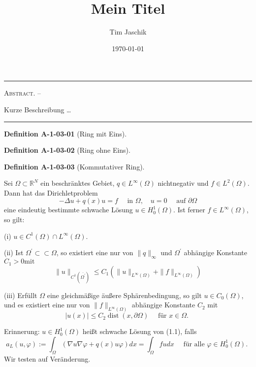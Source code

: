 \documentclass[10pt, letterpaper]{article}
\title{Mein Titel}
\author{Tim Jaschik}
\date{\today}
\renewenvironment{abstract}
  {
    \begin{adjustwidth}{1.5cm}{1.5cm}
    \small
    \textsc{Abstract. –}%
  }
  {
    \end{adjustwidth}
  }
\newcommand{\CustomHeading}[3]{%
  \par\medskip\noindent%
  \textbf{#1 #2} \textnormal{(#3)}.\enskip%
}
\newenvironment{DEF}[2]{\CustomHeading{Definition}{#1}{#2}}{}
\begin{document}
\maketitle
\rule{\textwidth}{0.5pt}
\begin{abstract}
Kurze Beschreibung …
\end{abstract}
\rule{\textwidth}{0.5pt}
\vspace{0.5cm}

\tableofcontents

\pagebreak




\begin{DEF}{A-1-03-01}{Ring mit Eins}
\end{DEF}

\begin{DEF}{A-1-03-02}{Ring ohne Eins}
\end{DEF}

\begin{DEF}{A-1-03-03}{Kommutativer Ring}
Sei $\Omega \subset \mathbb{R}^{N}$ ein beschränktes Gebiet, $q \in L^{\infty}(\Omega)$ nichtnegativ und $f \in L^{2}(\Omega)$. Dann hat das Dirichletproblem
$$
-\Delta u+q(x) u=f \quad \text { in } \Omega, \quad u=0 \quad \text { auf } \partial \Omega
$$
eine eindeutig bestimmte schwache Lösung $u \in H_{0}^{1}(\Omega)$. Ist ferner $f \in L^{\infty}(\Omega)$, so gilt:

(i) $u \in C^{1}(\Omega) \cap L^{\infty}(\Omega)$.

(ii) Ist $\Omega^{\prime} \subset \subset \Omega$, so existiert eine nur von $\|q\|_{\infty}$ und $\Omega^{\prime}$ abhängige Konstante $C_{1}>0 \mathrm{mit}$
$$
\|u\|_{C^{1}\left(\overline{\Omega^{\prime}}\right)} \leq C_{1}\left(\|u\|_{L^{\infty}(\Omega)}+\|f\|_{L^{\infty}(\Omega)}\right)
$$

(iii) Erfüllt $\Omega$ eine gleichmäßige äußere Sphärenbedingung, so gilt $u \in C_{0}(\Omega)$, und es existiert eine nur von $\|f\|_{L^{\infty}(\Omega)}$ abhängige Konstante $C_{2}$ mit
$$
|u(x)| \leq C_{2} \operatorname{dist}(x, \partial \Omega) \quad \text { für } x \in \Omega \text {. }
$$

Erinnerung: $u \in H_{0}^{1}(\Omega)$ heißt schwache Lösung von (1.1), falls
$$
a_{L}(u, \varphi):=\int_{\Omega}(\nabla u \nabla \varphi+q(x) u \varphi) d x=\int_{\Omega} f u d x \quad \text { für alle } \varphi \in H_{0}^{1}(\Omega) \text {. }
$$
Wir testen auf Veränderung.
\end{DEF}
\end{document}
